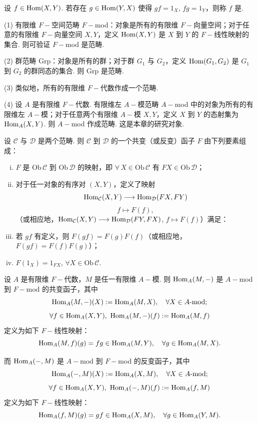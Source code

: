 设 $f \in \operatorname{Hom}(X,Y)$. 若存在 $g \in \operatorname{Hom}(Y,X)$ 使得 $gf = 1_X$, $fg = 1_Y$，则称 $f$ 是.

\begin{instance}
    (1) 有限维 $F-\!\!$空间范畴 $F-$mod：对象是所有的有限维 $F-\!\!$向量空间；对于任意的有限维 $F-\!\!$向量空间 $X,Y$，定义 $\operatorname{Hom}(X,Y)$ 是 $X$ 到 $Y$ 的 $F-\!\!$线性映射的集合. 则可验证 $F-$mod 是范畴.

    (2) 群范畴 $\mathrm{Grp}$：对象是所有的群；对于群 $G_1$ 与 $G_2$，定义 $\operatorname{Hom}(G_1,G_2)$ 是 $G_1$ 到 $G_2$ 的群同态的集合. 则 $\mathrm{Grp}$ 是范畴.

    (3) 类似地，所有的有限维 $F-\!\!$代数作成一个范畴.

    (4) 设 $A$ 是有限维 $F-\!\!$代数. 有限维左 $A-\!\!$模范畴 $A-$mod 中的对象为所有的有限维左 $A-\!\!$模；对于任意两个有限维 $A-\!\!$模 $X,Y$，定义 $X$ 到 $Y$ 的态射集为 $\operatorname{Hom}_A(X,Y)$. 则 $A-$mod 作成范畴. 这是本章的研究对象.
\end{instance}

\begin{definition}[函子]\label{def:functor}
    设 $\mathcal{C}$ 与 $\mathcal{D}$ 是两个范畴. 则 $\mathcal{C}$ 到 $\mathcal{D}$ 的一个共变（或反变）函子 $F$ 由下列要素组成：
    \begin{enumerate}[(i)]
        \item $F$ 是 $\mathrm{Ob}\,\mathcal{C}$ 到 $\mathrm{Ob}\,\mathcal{D}$ 的映射，即 $\forall\, X \in \mathrm{Ob}\,\mathcal{C}$ 有 $FX \in \mathrm{Ob}\,\mathcal{D}$；
        \item 对于任一对象的有序对 $(X,Y)$，定义了映射
        \[
        \operatorname{Hom}_{\mathcal{C}}(X,Y) \longrightarrow \operatorname{Hom}_{\mathcal{D}}(FX,FY)
        \]
        \[
        f \longmapsto F(f),
        \]
        （或相应地，$\operatorname{Hom}_{\mathcal{C}}(X,Y) \longrightarrow \operatorname{Hom}_{\mathcal{D}}(FY,FX)$, $f \longmapsto F(f)$）满足：
        \item[(\textrm{i}')] 若 $gf$ 有定义，则 $F(gf) = F(g)F(f)$（或相应地，$F(gf) = F(f)F(g)$）；
        \item[(\textrm{ii}')] $F(1_X) = 1_{FX}$, $\forall X \in \mathrm{Ob}\,\mathcal{C}$.
    \end{enumerate}
\end{definition}

\begin{instance}\label{inst:hom-functor}
    设 $A$ 是有限维 $F-\!\!$代数，$M$ 是任一有限维 $A-\!\!$模. 则 $\operatorname{Hom}_A(M,-)$ 是 $A-$mod 到 $F-$mod 的共变函子，其中
    \[
    \operatorname{Hom}_A(M,-)(X) := \operatorname{Hom}_A(M,X),\quad \forall X \in A\text{-}\mathrm{mod};
    \]
    \[
    \forall f \in \operatorname{Hom}_A(X,Y),\ \operatorname{Hom}_A(M,-)(f) := \operatorname{Hom}_A(M,f)
    \]
    定义为如下 $F-\!\!$线性映射：
    \[
    \operatorname{Hom}_A(M,f)(g) = fg \in \operatorname{Hom}_A(M,Y),\quad \forall g \in \operatorname{Hom}_A(M,X).
    \]

    而 $\operatorname{Hom}_A(-,M)$ 是 $A-$mod 到 $F-$mod 的反变函子，其中
    \[
    \operatorname{Hom}_A(-,M)(X) := \operatorname{Hom}_A(X,M),\quad \forall X \in A\text{-}\mathrm{mod};
    \]
    \[
    \forall f \in \operatorname{Hom}_A(X,Y),\ \operatorname{Hom}_A(-,M)(f) := \operatorname{Hom}_A(f,M)
    \]
    定义为如下 $F-\!\!$线性映射：
    \[
    \operatorname{Hom}_A(f,M)(g) = gf \in \operatorname{Hom}_A(X,M),\quad \forall g \in \operatorname{Hom}_A(Y,M).
    \]
\end{instance}


